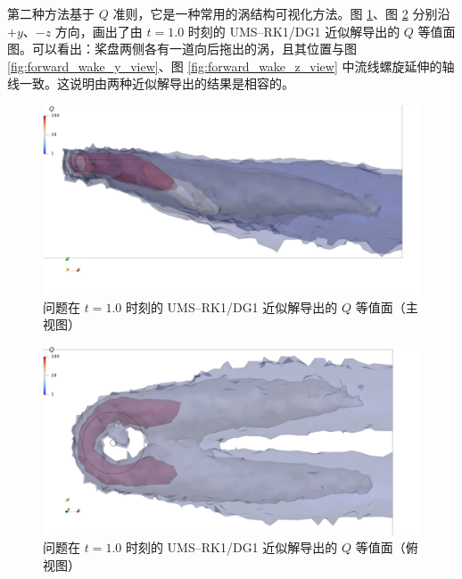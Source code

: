 第二种方法基于 $Q$ 准则，它是一种常用的涡结构可视化方法。图 \ref{fig:forward_Q_y_view}、图
\ref{fig:forward_Q_z_view} 分别沿 $+y$、$-z$ 方向，画出了由 $t=1.0$ 时刻的 UMS–RK1/DG1
近似解导出的 $Q$ 等值面图。可以看出：桨盘两侧各有一道向后拖出的涡，且其位置与图 \ref{fig:forward_wake_y_view}、图
\ref{fig:forward_wake_z_view} 中流线螺旋延伸的轴线一致。这说明由两种近似解导出的结果是相容的。

\begin{figure}[h!]
\begin{centering}
\includegraphics[width=1\textwidth,height=0.28\textheight,keepaspectratio]{figures/forward/p=1/Q_y+}
\par\end{centering}
\caption{\label{fig:forward_Q_y_view}问题在
$t=1.0$ 时刻的 UMS–RK1/DG1 近似解导出的 $Q$ 等值面（主视图）}
\end{figure}

\begin{figure}[h!]
\begin{centering}
\includegraphics[width=1\textwidth,height=0.28\textheight,keepaspectratio]{figures/forward/p=1/Q_z-}
\par\end{centering}
\caption{\label{fig:forward_Q_z_view}问题在
$t=1.0$ 时刻的 UMS–RK1/DG1 近似解导出的 $Q$ 等值面（俯视图）}
\end{figure}

